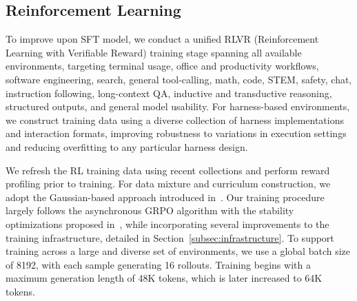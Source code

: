 \subsection{Reinforcement Learning}
\label{subsec:RL}



To improve upon SFT model, we conduct a unified RLVR (Reinforcement Learning with Verifiable Reward) training stage spanning all available environments, targeting terminal usage, office and productivity workflows, software engineering, search, general tool-calling, math, code, STEM, safety, chat, instruction following, long-context QA, inductive and transductive reasoning, structured outputs, and general model usability. For harness-based environments, we construct training data using a diverse collection of harness implementations and interaction formats, improving robustness to variations in execution settings and reducing overfitting to any particular harness design.

We refresh the RL training data using recent collections and perform reward profiling prior to training. For data mixture and curriculum construction, we adopt the Gaussian-based approach introduced in~\cite{nvidia2025nemotron3nanoopen}. Our training procedure largely follows the asynchronous GRPO algorithm with the stability optimizations proposed in~\cite{nvidia2026nemotron3superopen}, while incorporating several improvements to the training infrastructure, detailed in Section~\ref{subsec:infrastructure}. To support training across a large and diverse set of environments, we use a global batch size of 8192, with each sample generating 16 rollouts. Training begins with a maximum generation length of 48K tokens, which is later increased to 64K tokens. %
